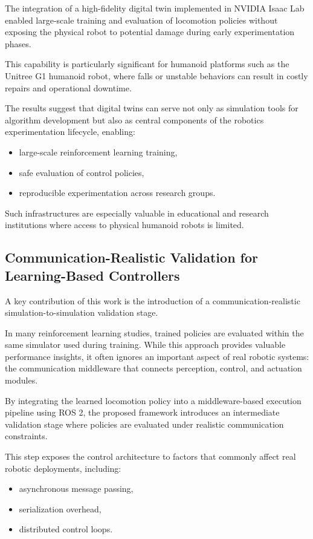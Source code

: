 \documentclass[pdflatex,sn-mathphys-num]{sn-jnl}%
\theoremstyle{thmstyleone}%
\theoremstyle{thmstyletwo}%
\theoremstyle{thmstylethree}%
\begin{document}
The integration of a high-fidelity digital twin implemented in NVIDIA Isaac Lab enabled large-scale training and evaluation of locomotion policies without exposing the physical robot to potential damage during early experimentation phases.

This capability is particularly significant for humanoid platforms such as the Unitree G1 humanoid robot, where falls or unstable behaviors can result in costly repairs and operational downtime.

The results suggest that digital twins can serve not only as simulation tools for algorithm development but also as central components of the robotics experimentation lifecycle, enabling:
\begin{itemize}
    \item large-scale reinforcement learning training,
    \item safe evaluation of control policies,
    \item reproducible experimentation across research groups.
\end{itemize} 

Such infrastructures are especially valuable in educational and research institutions where access to physical humanoid robots is limited.

\subsection{Communication-Realistic Validation for Learning-Based Controllers}
A key contribution of this work is the introduction of a communication-realistic simulation-to-simulation validation stage.

In many reinforcement learning studies, trained policies are evaluated within the same simulator used during training. While this approach provides valuable performance insights, it often ignores an important aspect of real robotic systems: the communication middleware that connects perception, control, and actuation modules.

By integrating the learned locomotion policy into a middleware-based execution pipeline using ROS 2, the proposed framework introduces an intermediate validation stage where policies are evaluated under realistic communication constraints.

This step exposes the control architecture to factors that commonly affect real robotic deployments, including:
\begin{itemize}
    \item asynchronous message passing,
    \item serialization overhead,
    \item distributed control loops.
\end{itemize} 
\end{document}
